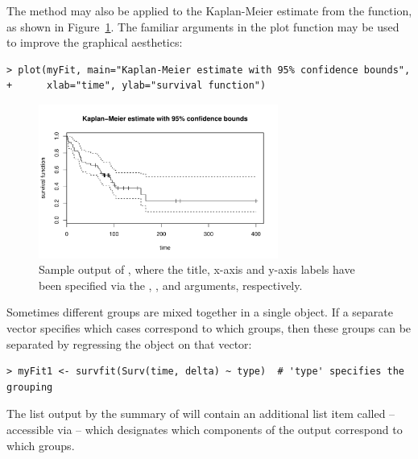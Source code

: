 \documentclass[article]{jss}
\begin{document}
The  method may also be applied to the Kaplan-Meier estimate from the  function, as shown in Figure~\ref{kmPlot}. The familiar arguments in the plot function may be used to improve the graphical aesthetics:
\begin{verbatim}
> plot(myFit, main="Kaplan-Meier estimate with 95% confidence bounds",
+      xlab="time", ylab="survival function")
\end{verbatim}
\begin{figure}
\centering
\includegraphics[width=0.7\textwidth]{../../figures/kmPlot.pdf}
\caption{Sample output of , where the title, x-axis and y-axis labels have been specified via the , , and  arguments, respectively.}
\label{kmPlot}
\end{figure}
Sometimes different groups are mixed together in a single  object. If a separate vector specifies which cases correspond to which groups, then these groups can be separated by regressing the  object on that vector:
\begin{verbatim}
> myFit1 <- survfit(Surv(time, delta) ~ type)  # 'type' specifies the grouping
\end{verbatim}
The list output by the summary of  will contain an additional list item called  -- accessible via  -- which designates which components of the output correspond to which groups.
\end{document}

